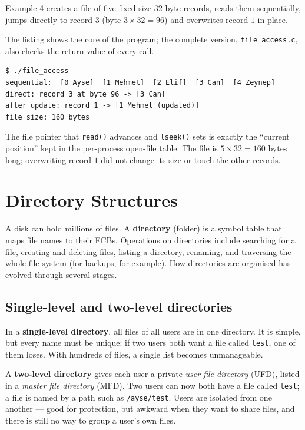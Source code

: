 \documentclass[11pt,a4paper]{article}
\newcommand{\term}[1]{\textbf{\color{mintdeep}#1}}
\newcommand{\cmd}[1]{\texttt{#1}}
\begin{document}
Example 4 creates a file of five fixed-size $32$-byte records, reads them sequentially, jumps directly to record $3$ (byte $3 \times 32 = 96$) and overwrites record $1$ in place.

The listing shows the core of the program; the complete version, \cmd{file\_access.c}, also checks the return value of every call.



\begin{lstlisting}[style=term]
$ ./file_access
sequential:  [0 Ayse]  [1 Mehmet]  [2 Elif]  [3 Can]  [4 Zeynep]
direct: record 3 at byte 96 -> [3 Can]
after update: record 1 -> [1 Mehmet (updated)]
file size: 160 bytes
\end{lstlisting}

The file pointer that \cmd{read()} advances and \cmd{lseek()} sets is exactly the ``current position'' kept in the per-process open-file table. The file is $5 \times 32 = 160$ bytes long; overwriting record $1$ did not change its size or touch the other records.

\section{Directory Structures}

A disk can hold millions of files. A \term{directory} (folder) is a symbol table that maps file names to their FCBs. Operations on directories include searching for a file, creating and deleting files, listing a directory, renaming, and traversing the whole file system (for backups, for example). How directories are organised has evolved through several stages.

\subsection{Single-level and two-level directories}

In a \term{single-level directory}, all files of all users are in one directory. It is simple, but every name must be unique: if two users both want a file called \texttt{test}, one of them loses. With hundreds of files, a single list becomes unmanageable.

A \term{two-level directory} gives each user a private \emph{user file directory} (UFD), listed in a \emph{master file directory} (MFD). Two users can now both have a file called \texttt{test}; a file is named by a path such as \texttt{/ayse/test}. Users are isolated from one another --- good for protection, but awkward when they want to share files, and there is still no way to group a user's own files.
\end{document}
